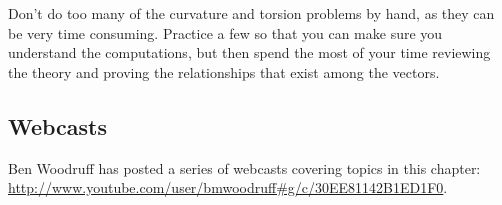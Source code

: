 Don't do too many of the curvature and torsion problems by hand, as
they can be very time consuming.  Practice a few so that you can make
sure you understand the computations, but then spend the most of your
time reviewing the theory and proving the relationships that exist
among the vectors.

\subsection{Webcasts}

Ben Woodruff has posted a series of webcasts covering topics in this
chapter: \url{http://www.youtube.com/user/bmwoodruff#g/c/30EE81142B1ED1F0}.

